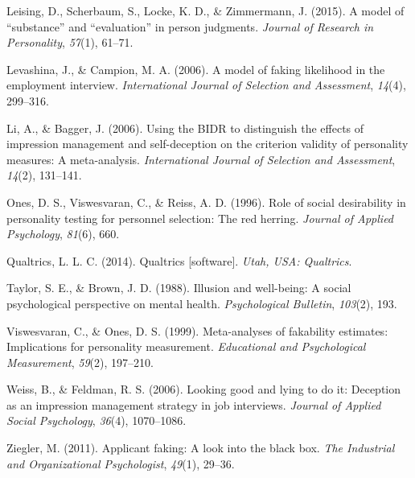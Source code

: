 \documentclass[
  english,
  ,jou]{apa6}
\begin{document}
\leavevmode\hypertarget{ref-leising_model_2015}{}%
Leising, D., Scherbaum, S., Locke, K. D., \& Zimmermann, J. (2015). A model of ``substance'' and ``evaluation'' in person judgments. \emph{Journal of Research in Personality}, \emph{57}(1), 61--71.

\leavevmode\hypertarget{ref-levashina_model_2006}{}%
Levashina, J., \& Campion, M. A. (2006). A model of faking likelihood in the employment interview. \emph{International Journal of Selection and Assessment}, \emph{14}(4), 299--316.

\leavevmode\hypertarget{ref-li_using_2006}{}%
Li, A., \& Bagger, J. (2006). Using the BIDR to distinguish the effects of impression management and self-deception on the criterion validity of personality measures: A meta-analysis. \emph{International Journal of Selection and Assessment}, \emph{14}(2), 131--141.

\leavevmode\hypertarget{ref-ones_role_1996}{}%
Ones, D. S., Viswesvaran, C., \& Reiss, A. D. (1996). Role of social desirability in personality testing for personnel selection: The red herring. \emph{Journal of Applied Psychology}, \emph{81}(6), 660.

\leavevmode\hypertarget{ref-qualtrics_qualtrics_2014}{}%
Qualtrics, L. L. C. (2014). Qualtrics {[}software{]}. \emph{Utah, USA: Qualtrics}.

\leavevmode\hypertarget{ref-taylor_illusion_1988}{}%
Taylor, S. E., \& Brown, J. D. (1988). Illusion and well-being: A social psychological perspective on mental health. \emph{Psychological Bulletin}, \emph{103}(2), 193.

\leavevmode\hypertarget{ref-viswesvaran_meta-analyses_1999}{}%
Viswesvaran, C., \& Ones, D. S. (1999). Meta-analyses of fakability estimates: Implications for personality measurement. \emph{Educational and Psychological Measurement}, \emph{59}(2), 197--210.

\leavevmode\hypertarget{ref-weiss_looking_2006}{}%
Weiss, B., \& Feldman, R. S. (2006). Looking good and lying to do it: Deception as an impression management strategy in job interviews. \emph{Journal of Applied Social Psychology}, \emph{36}(4), 1070--1086.

\leavevmode\hypertarget{ref-ziegler_applicant_2011}{}%
Ziegler, M. (2011). Applicant faking: A look into the black box. \emph{The Industrial and Organizational Psychologist}, \emph{49}(1), 29--36.

\endgroup
\end{document}
